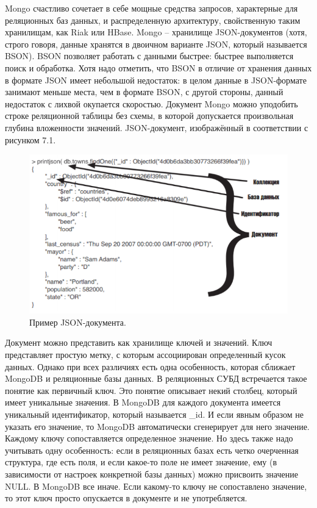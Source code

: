\documentclass[14pt]{extreport}
\begin{document}
Mongo счастливо сочетает в себе мощные средства запросов, характерные для реляционных баз данных, и распределенную архитектуру, свойственную таким хранилищам, как Riak или HBase. Mongo – хранилище JSON-документов (хотя, строго говоря, данные хранятся в двоичном варианте JSON, который называется BSON). BSON позволяет работать с данными быстрее: быстрее выполняется поиск и обработка. Хотя надо отметить, что BSON в отличие от хранения данных в формате JSON имеет небольшой недостаток: в целом данные в JSON-формате занимают меньше места, чем в формате BSON, с другой стороны, данный недостаток с лихвой окупается скоростью. Документ Mongo можно уподобить строке реляционной таблицы без схемы, в которой допускается произвольная глубина вложенности значений. JSON-документ, изображённый в соответствии с рисунком 7.1.
\begin{figure}[H]
\center\includegraphics[scale=0.75]{fig/img81.png}
\caption{Пример JSON-документа.}
\end{figure}

Документ можно представить как хранилище ключей и значений. Ключ представляет простую метку, с которым ассоциирован определенный кусок данных. Однако при всех различиях есть одна особенность, которая сближает MongoDB и реляционные базы данных. В реляционных СУБД встречается такое понятие как первичный ключ. Это понятие описывает некий столбец, который имеет уникальные значения. В MongoDB для каждого документа имеется уникальный идентификатор, который называется \_id. И если явным образом не указать его значение, то MongoDB автоматически сгенерирует для него значение. Каждому ключу сопоставляется определенное значение. Но здесь также надо учитывать одну особенность: если в реляционных базах есть четко очерченная структура, где есть поля, и если какое-то поле не имеет значение, ему (в зависимости от настроек конкретной базы данных) можно присвоить значение NULL. В MongoDB все иначе. Если какому-то ключу не сопоставлено значение, то этот ключ просто опускается в документе и не употребляется.
\end{document}
